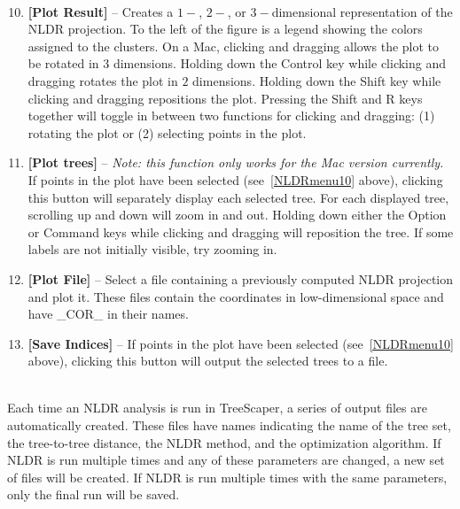 \documentclass[11pt]{article}
\begin{document}
\\


\begin{enumerate}[{\bf 1-}]
\setcounter{enumi}{9}
\item {\bf [Plot Result]} -- Creates a $1-$, $2-$, or $3-$dimensional representation of the NLDR projection. To the left of the figure is a legend showing the colors assigned to the clusters. On a Mac,
clicking and dragging allows the plot to be rotated in $3$ dimensions. Holding down the
Control key while clicking and dragging rotates the plot in $2$ dimensions. Holding down the
Shift key while clicking and dragging repositions the plot. Pressing the Shift and R keys
together will toggle in between two functions for clicking and dragging: (1) rotating the plot
or (2) selecting points in the plot. \label{NLDRmenu10}

\item {\bf [Plot trees]} --  {\it Note: this function only works for the Mac version currently.} If points in the
plot have been selected (see~\ref{NLDRmenu10} above), clicking this button will separately display each selected tree. For each displayed tree, scrolling up and down will zoom in and out. Holding
down either the Option or Command keys while clicking and dragging will reposition the
tree. If some labels are not initially visible, try zooming in.

\item {\bf [Plot File]} -- Select a file containing a previously computed NLDR projection and plot it.
These files contain the coordinates in low-dimensional space and have \_COR\_ in their
names.

\item {\bf [Save Indices]} -- If points in the plot have been selected (see~\ref{NLDRmenu10} above), clicking this button will output the selected trees to a file. \\
\end{enumerate}


\\


\noindent Each time an NLDR analysis is run in TreeScaper, a series of output files are automatically
created. These files have names indicating the name of the tree set, the tree-to-tree distance,
the NLDR method, and the optimization algorithm. If NLDR is run multiple times and any of
these parameters are changed, a new set of files will be created. If NLDR is run multiple times
with the same parameters, only the final run will be saved. \\
\end{document}
